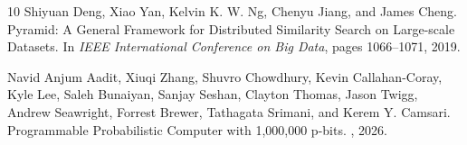 \documentclass[10pt,twocolumn]{article}
\begin{document}
\begin{thebibliography}{10}
Shiyuan Deng, Xiao Yan, Kelvin K. W. Ng, Chenyu Jiang, and James Cheng.
\newblock Pyramid: A General Framework for Distributed Similarity Search on Large-scale Datasets.
\newblock In {\em IEEE International Conference on Big Data}, pages 1066--1071, 2019.

Navid Anjum Aadit, Xiuqi Zhang, Shuvro Chowdhury, Kevin Callahan-Coray, Kyle Lee, Saleh Bunaiyan, Sanjay Seshan, Clayton Thomas, Jason Twigg, Andrew Seawright, Forrest Brewer, Tathagata Srimani, and Kerem Y. Camsari.
\newblock Programmable Probabilistic Computer with 1,000,000 p-bits.
, 2026.

\end{thebibliography}
\end{document}
